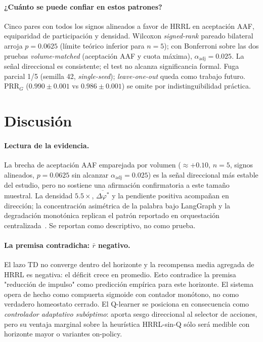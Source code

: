 \documentclass{llncs}
\begin{document}
\paragraph{¿Cu\'anto se puede confiar en estos patrones?}
Cinco pares con todos los signos alineados a favor de HRRL en
aceptaci\'on AAF, equiparidad de participaci\'on y densidad. Wilcoxon
\emph{signed-rank} pareado bilateral arroja $p{=}0.0625$ (l\'imite
te\'orico inferior para $n{=}5$); con Bonferroni sobre las dos pruebas
\emph{volume-matched} (aceptaci\'on AAF y cuota m\'axima),
$\alpha_{\text{adj}}{=}0.025$. La se\~nal direccional es consistente;
el test no alcanza significancia formal. Fuga parcial 1/5 (semilla 42,
\emph{single-seed}); \emph{leave-one-out} queda como trabajo futuro.
PRR$_G$ ($0.990 \pm 0.001$ vs $0.986 \pm 0.001$) se omite por
indistinguibilidad pr\'actica.

\section{Discusi\'on}
\label{sec:discussion}

\paragraph{Lectura de la evidencia.}
La brecha de aceptaci\'on AAF emparejada por volumen ($\approx{+}0.10$,
$n{=}5$, signos alineados, $p{=}0.0625$ sin alcanzar $\alpha_{\text{adj}}{=}0.025$)
es la se\~nal direccional m\'as estable del estudio, pero no sostiene
una afirmaci\'on confirmatoria a este tama\~no muestral. La densidad
$5.5\times$, $\overline{\Delta\varphi^*}$ y la pendiente positiva
acompa\~nan en direcci\'on; la concentraci\'on asim\'etrica de la
palabra bajo LangGraph y la degradaci\'on monot\'onica replican el
patr\'on reportado en orquestaci\'on
centralizada~\parencite{becker2025problemdrift}. Se reportan como
descriptivo, no como prueba.

\paragraph{La premisa contradicha: $\bar r$ negativo.}
El lazo TD no converge dentro del horizonte y la recompensa media
agregada de HRRL es negativa: el d\'eficit crece en promedio. Esto
contradice la premisa "reducci\'on de impulso" como predicci\'on
emp\'irica para este horizonte. El sistema opera de hecho como
compuerta sigmoide con contador mon\'otono, no como verdadero
homeostato cerrado. El Q-learner se posiciona en consecuencia como
\emph{controlador adaptativo sub\'optimo}: aporta sesgo direccional al
selector de acciones, pero su ventaja marginal sobre la heur\'istica
HRRL-sin-Q s\'olo ser\'a medible con horizonte mayor o variantes
on-policy.
\end{document}
